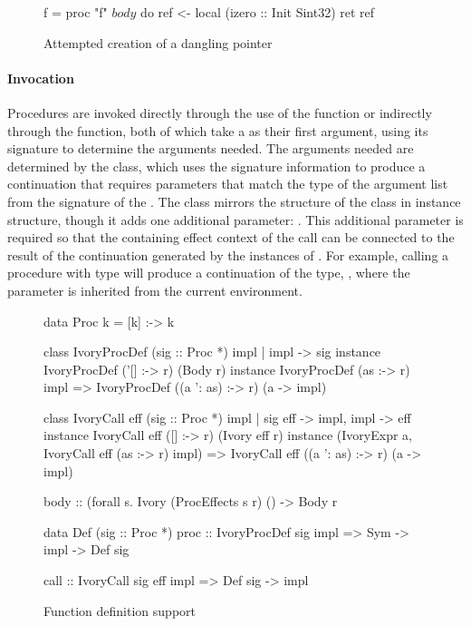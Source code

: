 \begin{figure}[h]
\begin{code}
f = proc "f" $ body $ do
  ref <- local (izero :: Init Sint32)
  ret ref
\end{code}
\caption{Attempted creation of a dangling pointer}
\label{fig:proc-def}
\end{figure}

\paragraph{Invocation} Procedures are invoked directly through the use of the
 function or indirectly through the  function, both of which
take a  as their first argument, using its signature to determine the
arguments needed.  The arguments needed are determined by the 
class, which uses the signature information to produce a continuation that
requires parameters that match the type of the argument list from the signature
of the .  The  class mirrors the structure of the
 class in instance structure, though it adds one additional
parameter: .  This additional parameter is required so that the
containing effect context of the call can be connected to the result of the
continuation generated by the instances of .  For example, calling
a procedure with type  will produce a
continuation of the type, , where the 
parameter is inherited from the current environment.


\begin{figure}[h]
\begin{code}
data Proc k = [k] :-> k

class IvoryProcDef (sig :: Proc *) impl | impl -> sig
instance IvoryProcDef ('[] :-> r) (Body r)
instance IvoryProcDef (as :-> r) impl
  => IvoryProcDef ((a ': as) :-> r) (a -> impl)

class IvoryCall eff (sig :: Proc *) impl
  | sig eff -> impl, impl -> eff
instance IvoryCall eff ([] :-> r) (Ivory eff r)
instance (IvoryExpr a, IvoryCall eff (as :-> r) impl)
  => IvoryCall eff ((a ': as) :-> r) (a -> impl)

body :: (forall s. Ivory (ProcEffects s r) () -> Body r

data Def (sig :: Proc *)
proc :: IvoryProcDef sig impl
     => Sym -> impl -> Def sig

call :: IvoryCall sig eff impl => Def sig -> impl
\end{code}
\caption{Function definition support}
\label{fig:proc-defs}
\end{figure}



